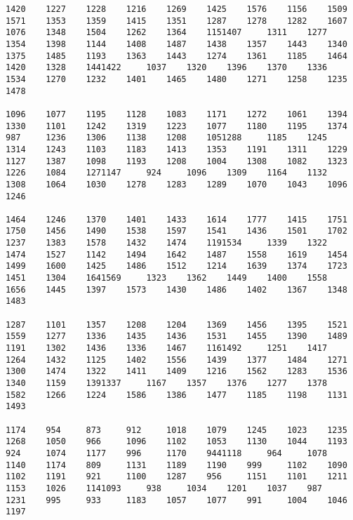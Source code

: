 \begin{verbatim}
1420    1227    1228    1216    1269    1425    1576    1156    1509    1571    1353    1359    1415    1351    1287    1278    1282    1607    1076    1348    1504    1262    1364    1151407     1311    1277    1354    1398    1144    1408    1487    1438    1357    1443    1340    1375    1485    1193    1363    1443    1274    1361    1185    1464    1420    1328    1441422     1037    1320    1396    1370    1336    1534    1270    1232    1401    1465    1480    1271    1258    1235    1478

1096    1077    1195    1128    1083    1171    1272    1061    1394    1330    1101    1242    1319    1223    1077    1180    1195    1374    987     1236    1306    1138    1208    1051288     1185    1245    1314    1243    1103    1183    1413    1353    1191    1311    1229    1127    1387    1098    1193    1208    1004    1308    1082    1323    1226    1084    1271147     924     1096    1309    1164    1132    1308    1064    1030    1278    1283    1289    1070    1043    1096    1246

1464    1246    1370    1401    1433    1614    1777    1415    1751    1750    1456    1490    1538    1597    1541    1436    1501    1702    1237    1383    1578    1432    1474    1191534     1339    1322    1474    1527    1142    1494    1642    1487    1558    1619    1454    1499    1600    1425    1486    1512    1214    1639    1374    1723    1451    1304    1641569     1323    1362    1449    1400    1558    1656    1445    1397    1573    1430    1486    1402    1367    1348    1483

1287    1101    1357    1208    1204    1369    1456    1395    1521    1559    1277    1336    1435    1436    1531    1455    1390    1489    1191    1302    1436    1336    1467    1161492     1251    1417    1264    1432    1125    1402    1556    1439    1377    1484    1271    1300    1474    1322    1411    1409    1216    1562    1283    1536    1340    1159    1391337     1167    1357    1376    1277    1378    1582    1266    1224    1586    1386    1477    1185    1198    1131    1493

1174    954     873     912     1018    1079    1245    1023    1235    1268    1050    966     1096    1102    1053    1130    1044    1193    924     1074    1177    996     1170    9441118     964     1078    1140    1174    809     1131    1189    1190    999     1102    1090    1102    1191    921     1100    1287    956     1151    1101    1211    1153    1026    1141093     938     1034    1201    1037    987     1231    995     933     1183    1057    1077    991     1004    1046    1197


\end{verbatim}
